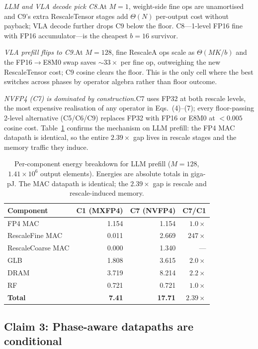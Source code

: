 \documentclass[conference]{IEEEtran}
\begin{document}
\emph{LLM and VLA decode pick C8.}\quad At $M{=}1$, weight-side
fine ops are unamortised and C9's extra RescaleTensor stages add
$\Theta(N)$ per-output cost without payback; VLA decode further
drops C9 below the floor.  C8---1-level FP16 fine with FP16
accumulator---is the cheapest $b{=}16$ survivor.

\emph{VLA prefill flips to C9.}\quad At $M{=}128$, fine RescaleA
ops scale as $\Theta(MK/b)$ and the FP16$\to$E8M0 swap saves
${\sim}33\!\times$ per fine op, outweighing the new RescaleTensor
cost; C9 cosine clears the floor.  This is the only cell where
the best switches across phases by operator algebra rather than
floor outcome.

\emph{NVFP4 (C7) is dominated by construction.}\quad C7 uses FP32
at both rescale levels, the most expensive realisation of any
operator in Eqs.~(4)--(7); every floor-passing 2-level
alternative (C5/C6/C9) replaces FP32 with FP16 or E8M0 at
${<}0.005$ cosine cost.  Table~\ref{tab:component} confirms the
mechanism on LLM prefill: the FP4 MAC datapath is identical, so
the entire $2.39\!\times$ gap lives in rescale stages and the
memory traffic they induce.

\begin{table}[t]
\centering
\caption{Per-component energy breakdown for LLM prefill
($M{=}128$, $1.41\!\times\!10^6$ output elements).  Energies are
absolute totals in giga-pJ.  The MAC datapath is identical; the
$2.39\!\times$ gap is rescale and rescale-induced memory.}
\label{tab:component}
\small
\begin{tabular}{@{}lrrr@{}}
\toprule
Component       & C1 (MXFP4) & C7 (NVFP4) & C7/C1 \\
\midrule
FP4 MAC          & 1.154 & 1.154  & $1.0\times$ \\
RescaleFine MAC  & 0.011 & 2.669  & $247\times$ \\
RescaleCoarse MAC& 0.000 & 1.340  & --- \\
GLB              & 1.808 & 3.615  & $2.0\times$ \\
DRAM             & 3.719 & 8.214  & $2.2\times$ \\
RF               & 0.721 & 0.721  & $1.0\times$ \\
\midrule
\textbf{Total}   & \textbf{7.41} & \textbf{17.71} & $\mathbf{2.39\times}$ \\
\bottomrule
\end{tabular}
\end{table}

\subsection{Claim 3: Phase-aware datapaths are conditional}
\label{sec:phaseadap}
\end{document}
